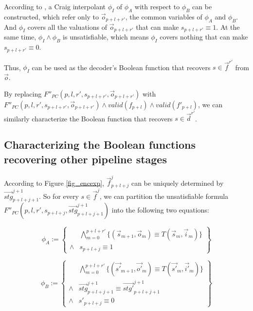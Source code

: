 \documentclass[conference]{IEEEtran}
\begin{document}

According to \cite{InterpBoolFunction},
a Craig interpolant $\phi_I$ of $\phi_A$ with respect to $\phi_B$ can be constructed,
which refer only to $\vec{o}_{p+l+r'}$,
the common variables of $\phi_A$ and $\phi_B$.
And $\phi_I$ covers all the valuations of $\vec{o}_{p+l+r'}$ that can make $s_{p+l+r'}\equiv 1$.
At the same time,
$\phi_I\wedge \phi_B$ is unsatisfiable,
which means $\phi_I$ covers nothing that can make $s_{p+l+r'}\equiv 0$.

Thus,
$\phi_I$ can be used as the decoder's Boolean function 
that recovers $s\in \vec{f}^{r'}$ from $\vec{o}$.

By replacing $F''_{PC}(p,l,r',s_{p+l+r'},\vec{o}_{p+l+r'})$ with $F''_{PC}(p,l,r',s_{p+l+r'},\vec{o}_{p+l+r'})\wedge valid(f_{p+l})\wedge valid(f'_{p+l})$,
we can similarly characterize the Boolean function that recovers $s\in\vec{d}^{r'}$.

\subsection{Characterizing the Boolean functions recovering other pipeline stages}
According to Figure \ref{fig_encexp},
$\vec{f}^j_{p+l+j}$ can be uniquely determined by $\vec{stg}^{j+1}_{p+l+j+1}$.
So for every $s\in\vec{f}^j$,
we can partition the unsatisfiable formula $F''_{PC}(p,l,r',s_{p+l+j},\vec{stg}^{j+1}_{p+l+j+1})$ 
 into the following two equations:

\begin{equation}
 \phi_A := 
 \left\{
\begin{array}{cc}
&\bigwedge_{m=0}^{p+l+r'}
\{
(\vec{s}_{m+1},\vec{o}_m)\equiv T(\vec{s}_m,\vec{i}_m)
\}
\\
\wedge& s_{p+l+j}\equiv 1 
\end{array}
\right\}
\end{equation}

\begin{equation}
\phi_B := 
\left\{
\begin{array}{cc}
&\bigwedge_{m=0}^{p+l+r'}
\{
(\vec{s'}_{m+1},\vec{o'}_m)\equiv T(\vec{s'}_m,\vec{i'}_m)
\}
\\
\wedge&\vec{stg}^{j+1}_{p+l+j+1}\equiv \vec{stg'}^{j+1}_{p+l+j+1} \\
\wedge& s'_{p+l+j}\equiv 0 
\end{array}
\right\}
\end{equation}
\end{document}
